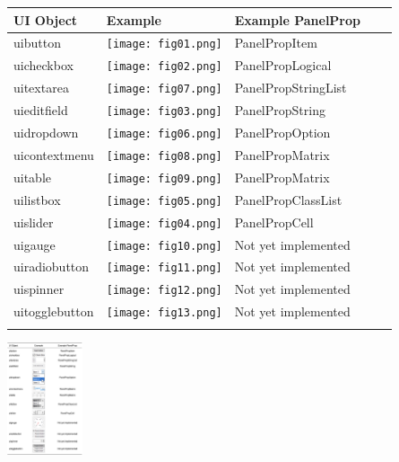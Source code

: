 \documentclass{tufte-handout}
\begin{document}
{%
\newcommand{\addpicbutton}{\texttt{[image: fig01.png]}}
\newcommand{\addpiccheckbox}{\texttt{[image: fig02.png]}}
\newcommand{\addpiceditfield}{\texttt{[image: fig03.png]}}
\newcommand{\addpicslider}{\texttt{[image: fig04.png]}}
\newcommand{\addpiclistbox}{\texttt{[image: fig05.png]}}
\newcommand{\addpicdropdown}{\texttt{[image: fig06.png]}}
\newcommand{\addpictextarea}{\texttt{[image: fig07.png]}}
\newcommand{\addpiccontextmenu}{\texttt{[image: fig08.png]}}
\newcommand{\addpictable}{\texttt{[image: fig09.png]}}
\newcommand{\addpicgauge}{\texttt{[image: fig10.png]}}
\newcommand{\addpicradiobutton}{\texttt{[image: fig11.png]}}
\newcommand{\addpicspinner}{\texttt{[image: fig12.png]}}
\newcommand{\addpictogglebutton}{\texttt{[image: fig13.png]}}
\begin{table}\sffamily
	\begin{tabular}{l*4{C}@{}}
		\toprule
		UI Object & Example & Example PanelProp \\ 
		\midrule
		uibutton & \addpicbutton & PanelPropItem \\ 
		uicheckbox & \addpiccheckbox & PanelPropLogical \\ 
		uitextarea  & \addpictextarea & PanelPropStringList \\
		uieditfield & \addpiceditfield & PanelPropString \\
		uidropdown & \addpicdropdown & PanelPropOption \\
		uicontextmenu & \addpiccontextmenu & PanelPropMatrix \\
		uitable & \addpictable & PanelPropMatrix \\
		uilistbox & \addpiclistbox & PanelPropClassList \\
		uislider & \addpicslider & PanelPropCell \\
		uigauge & \addpicgauge & Not yet implemented \\
		uiradiobutton & \addpicradiobutton & Not yet implemented \\
		uispinner & \addpicspinner & Not yet implemented \\
		uitogglebutton & \addpictogglebutton & Not yet implemented \\
		\bottomrule \\
	\end{tabular}
\end{table}
}%

\includegraphics[width=6em]{table.png}
\end{document}
